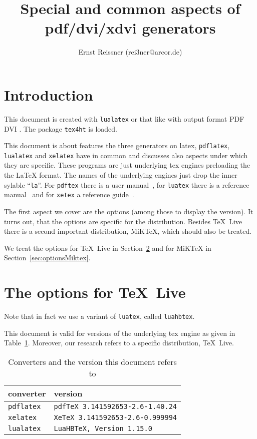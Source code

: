\documentclass[a4paper]{article}%
\title{Special and common aspects of pdf/dvi/xdvi generators }
\author{Ernst Reissner (rei3ner@arcor.de)}
\date{}
\newcommand{\pdflatex}{\texttt{pdflatex}}
\newcommand{\lualatex}{\texttt{lualatex}}
\newcommand{\xelatex}{\texttt{xelatex}}
\newcommand{\texlive}{\TeX~Live}
\newcommand{\miktex}{MiKTeX}
\begin{document}
\maketitle
\tableofcontents
\listoftables

\section{Introduction}

This document is created with \lualatex{} or that like 
with output format 
\ifpdf%
PDF%
\else
DVI%
\fi.
The package \texttt{tex4ht} 
is  loaded. 

This document is about features the three generators on latex, 
\pdflatex, \lualatex{} and \xelatex{} have in common 
and discusses also aspects under which they are specific. 
These programs are just underlying tex engines preloading the the \LaTeX{} format. 
The names of the underlying engines just drop the inner sylable ``\texttt{la}''. 
For \texttt{pdftex} there is a user manual~\cite{PdfTexUsr}, 
for \texttt{luatex} there is a reference manual~\cite{LuaTexRef} and 
for \texttt{xetex} a reference guide~\cite{XeTexRef}. 

The first aspect we cover are the options (among those to display the version). 
It turns out, that the options are specific for the distribution. 
Besides \texlive{} there is a second important distribution, \miktex, 
which should also be treated. 





We treat the options for \texlive{} in Section~\ref{sec:optionsTexlive} 
and for \miktex{} in Section~\ref{sec:optionsMiktex}. 

\section{The options for \texlive}\label{sec:optionsTexlive}


Note that in fact we use a variant of \texttt{luatex}, called \texttt{luahbtex}. 

This document is valid for versions of the underlying tex engine 
as given in Table~\ref{tab:versions}. 
Moreover, our research refers to a specific distribution, \texlive. 


\begin{longtable}{|ll|}
  \toprule
  converter & version \\
  \midrule
  \midrule
  \endfirsthead%
  \bottomrule
  \caption{\label{tab:versions} Converters and the version this document refers to }
  \endlastfoot%
  \pdflatex{}  & \texttt{pdfTeX 3.141592653-2.6-1.40.24} \\%
  \xelatex{}   & \texttt{XeTeX 3.141592653-2.6-0.999994} \\%
  \lualatex{}  & \texttt{LuaHBTeX, Version 1.15.0} \\
\end{longtable}
\end{document}
